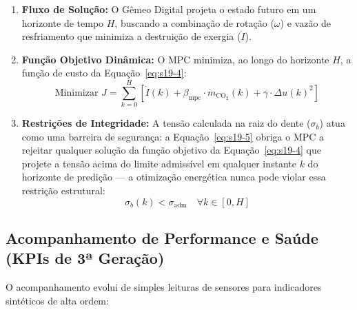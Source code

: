 \documentclass[12pt,a4paper]{article}
\numberwithin{equation}{section}
\numberwithin{table}{section}
\numberwithin{figure}{section}
\begin{document}
\begin{enumerate}
	\item \textbf{Fluxo de Solução:}
	O Gêmeo Digital projeta o estado futuro em um horizonte de tempo $H$, buscando a combinação de rotação ($\omega$) e vazão de resfriamento que minimiza a destruição de exergia ($\dot{I}$).
	
	\item \textbf{Função Objetivo Dinâmica:} O MPC minimiza, ao longo do horizonte $H$, a função de custo da Equação~\eqref{eq:s19-4}:
	\begin{equation}\label{eq:s19-4}
 \text{Minimizar } J = \sum_{k=0}^{H} \left[ \dot{I}(k) + \beta_{\text{mpc}} \cdotp \dot{m}_{\text{CO}_2}(k) + \gamma \cdotp \Delta u(k)^2 \right]
\end{equation}
	
	\item \textbf{Restrições de Integridade:}
	A tensão calculada na raiz do dente ($\sigma_b$) atua como uma barreira de segurança: a Equação~\eqref{eq:s19-5} obriga o MPC a rejeitar qualquer solução da função objetivo da Equação~\eqref{eq:s19-4} que projete a tensão acima do limite admissível em qualquer instante $k$ do horizonte de predição — a otimização energética nunca pode violar essa restrição estrutural:
	\begin{equation}\label{eq:s19-5}
 \sigma_b(k) < \sigma_{\text{adm}} \quad \forall k \in [0, H]
\end{equation}
\end{enumerate}

\subsection{Acompanhamento de Performance e Saúde (KPIs de 3ª Geração)}

O acompanhamento evolui de simples leituras de sensores para indicadores sintéticos de alta ordem:
\end{document}
